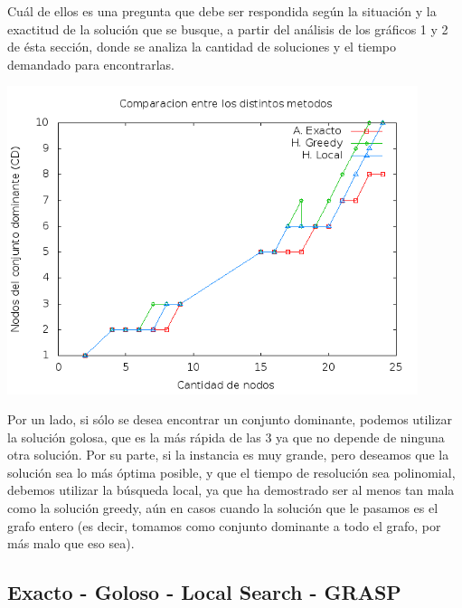 Cuál de ellos es una pregunta que debe ser respondida según la situación y la exactitud de la solución que se busque, a partir del análisis de los gráficos 1 y 2 de ésta sección, donde se analiza la cantidad de soluciones y el tiempo demandado para encontrarlas. 

\begin{center}
  \includegraphics[width=12cm]{./graficos/local_comparacion_soluciones.png}
\end{center}

Por un lado, si sólo se desea encontrar un conjunto dominante, podemos utilizar la solución golosa, que es la más rápida de las 3 ya que no depende de ninguna otra solución. Por su parte, si la instancia es muy grande, pero deseamos que la solución sea lo más óptima posible, y que el tiempo de resolución sea polinomial, debemos utilizar la búsqueda local, ya que ha demostrado ser al menos tan mala como la solución greedy, aún en casos cuando la solución que le pasamos es el grafo entero (es decir, tomamos como conjunto dominante a todo el grafo, por más malo que eso sea). 


\subsection{Exacto - Goloso - Local Search - GRASP}

